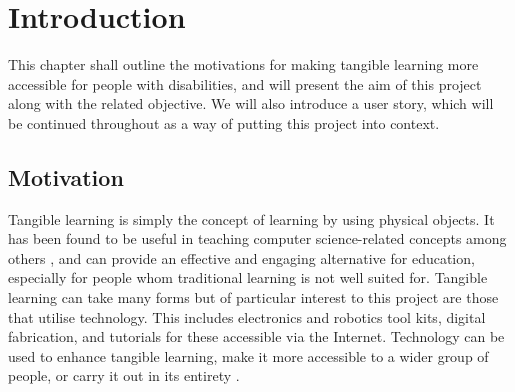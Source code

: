 \documentclass{l4proj}
\begin{document}
\tableofcontents

%
%
%
%
%
%
\chapter{Introduction}
\label{introduction}

This chapter shall outline the motivations for making tangible learning more accessible for people with disabilities, and will present the aim of this project along with the related objective. We will also introduce a user story, which will be continued throughout as a way of putting this project into context. 

\section{Motivation}
Tangible learning is simply the concept of learning by using physical objects. It has been found to be useful in teaching computer science-related concepts among others \citep{Mar2015}, and can provide an effective and engaging alternative for education, especially for people whom traditional learning is not well suited for. Tangible learning can take many forms but of particular interest to this project are those that utilise technology. This includes electronics and robotics tool kits, digital fabrication, and tutorials for these accessible via the Internet. Technology can be used to enhance tangible learning, make it more accessible to a wider group of people, or carry it out in its entirety \citep{Qi2018}.
\end{document}
